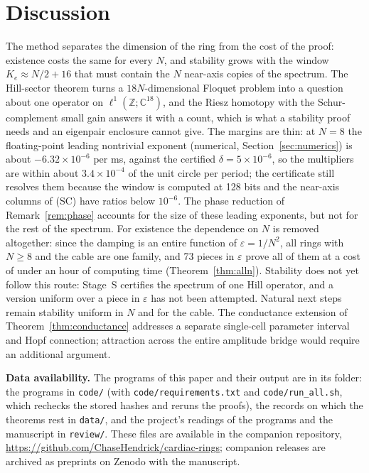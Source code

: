 \documentclass[11pt]{article}
\theoremstyle{definition}
\newcommand{\C}{\mathbb{C}}
\newcommand{\Z}{\mathbb{Z}}
\begin{document}
\section{Discussion}\label{sec:discussion}

The method separates the dimension of the ring from the cost of the proof: existence costs the same for every $N$, and stability grows with the window $K_e \approx N/2 + 16$ that must contain the $N$ near-axis copies of the spectrum. The Hill-sector theorem turns a $18N$-dimensional Floquet problem into a question about one operator on $\ell^1(\Z; \C^{18})$, and the Riesz homotopy with the Schur-complement small gain answers it with a count, which is what a stability proof needs and an eigenpair enclosure cannot give. The margins are thin: at $N = 8$ the floating-point leading nontrivial exponent (numerical, Section~\ref{sec:numerics}) is about $-6.32 \times 10^{-6}$ per ms, against the certified $\delta = 5 \times 10^{-6}$, so the multipliers are within about $3.4 \times 10^{-4}$ of the unit circle per period; the certificate still resolves them because the window is computed at 128 bits and the near-axis columns of (SC) have ratios below $10^{-6}$. The phase reduction of Remark~\ref{rem:phase} accounts for the size of these leading exponents, but not for the rest of the spectrum. For existence the dependence on $N$ is removed altogether: since the damping is an entire function of $\varepsilon = 1/N^2$, all rings with $N \ge 8$ and the cable are one family, and 73 pieces in $\varepsilon$ prove all of them at a cost of under an hour of computing time (Theorem~\ref{thm:alln}). Stability does not yet follow this route: Stage~S certifies the spectrum of one Hill operator, and a version uniform over a piece in $\varepsilon$ has not been attempted. Natural next steps remain stability uniform in $N$ and for the cable. The conductance extension of Theorem~\ref{thm:conductance} addresses a separate single-cell parameter interval and Hopf connection; attraction across the entire amplitude bridge would require an additional argument.

\medskip
{\raggedright\noindent\textbf{Data availability.} The programs of this paper and their output are in its folder: the programs in \texttt{code/} (with \texttt{code/requirements.txt} and \texttt{code/run\_all.sh}, which rechecks the stored hashes and reruns the proofs), the records on which the theorems rest in \texttt{data/}, and the project's readings of the programs and the manuscript in \texttt{review/}. These files are available in the companion repository, \url{https://github.com/ChaseHendrick/cardiac-rings}; companion releases are archived as preprints on Zenodo with the manuscript.\par}
\end{document}
